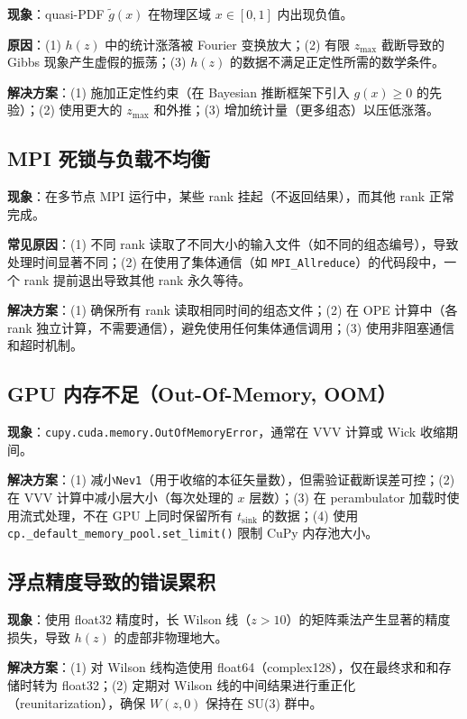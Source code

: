 \documentclass[11pt,a4paper]{ctexart}
\begin{document}
\textbf{现象}：quasi-PDF $\tilde{g}(x)$ 在物理区域 $x \in [0,1]$ 内出现负值。

\textbf{原因}：(1) $h(z)$ 中的统计涨落被 Fourier 变换放大；(2) 有限 $z_{\text{max}}$ 截断导致的 Gibbs 现象产生虚假的振荡；(3) $h(z)$ 的数据不满足正定性所需的数学条件。

\textbf{解决方案}：(1) 施加正定性约束（在 Bayesian 推断框架下引入 $g(x) \ge 0$ 的先验）；(2) 使用更大的 $z_{\text{max}}$ 和外推；(3) 增加统计量（更多组态）以压低涨落。

\subsection{MPI 死锁与负载不均衡}

\textbf{现象}：在多节点 MPI 运行中，某些 rank 挂起（不返回结果），而其他 rank 正常完成。

\textbf{常见原因}：(1) 不同 rank 读取了不同大小的输入文件（如不同的组态编号），导致处理时间显著不同；(2) 在使用了集体通信（如 \texttt{MPI\_Allreduce}）的代码段中，一个 rank 提前退出导致其他 rank 永久等待。

\textbf{解决方案}：(1) 确保所有 rank 读取相同时间的组态文件；(2) 在 OPE 计算中（各 rank 独立计算，不需要通信），避免使用任何集体通信调用；(3) 使用非阻塞通信和超时机制。

\subsection{GPU 内存不足（Out-Of-Memory, OOM）}

\textbf{现象}：\texttt{cupy.cuda.memory.OutOfMemoryError}，通常在 VVV 计算或 Wick 收缩期间。

\textbf{解决方案}：(1) 减小\texttt{Nev1}（用于收缩的本征矢量数），但需验证截断误差可控；(2) 在 VVV 计算中减小层大小（每次处理的 $x$ 层数）；(3) 在 perambulator 加载时使用流式处理，不在 GPU 上同时保留所有 $t_{\text{sink}}$ 的数据；(4) 使用 \texttt{cp.\_default\_memory\_pool.set\_limit()} 限制 CuPy 内存池大小。

\subsection{浮点精度导致的错误累积}

\textbf{现象}：使用 float32 精度时，长 Wilson 线（$z > 10$）的矩阵乘法产生显著的精度损失，导致 $h(z)$ 的虚部非物理地大。

\textbf{解决方案}：(1) 对 Wilson 线构造使用 float64（complex128），仅在最终求和和存储时转为 float32；(2) 定期对 Wilson 线的中间结果进行重正化（reunitarization），确保 $W(z,0)$ 保持在 SU(3) 群中。
\end{document}
